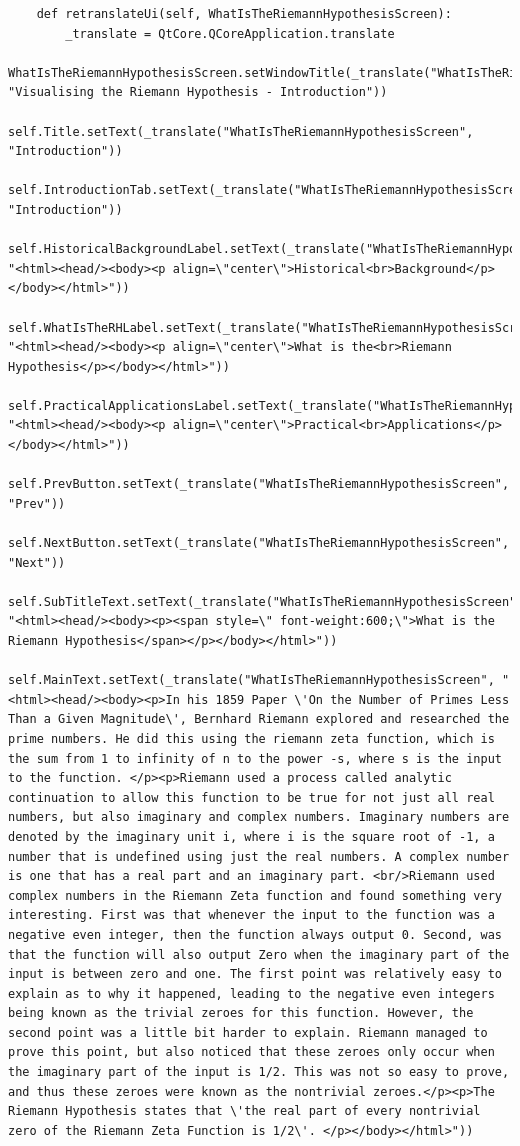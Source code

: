 \documentclass{article}
\begin{document}
\begin{lstlisting}
    def retranslateUi(self, WhatIsTheRiemannHypothesisScreen):
        _translate = QtCore.QCoreApplication.translate
        WhatIsTheRiemannHypothesisScreen.setWindowTitle(_translate("WhatIsTheRiemannHypothesisScreen", "Visualising the Riemann Hypothesis - Introduction"))
        self.Title.setText(_translate("WhatIsTheRiemannHypothesisScreen", "Introduction"))
        self.IntroductionTab.setText(_translate("WhatIsTheRiemannHypothesisScreen", "Introduction"))
        self.HistoricalBackgroundLabel.setText(_translate("WhatIsTheRiemannHypothesisScreen", "<html><head/><body><p align=\"center\">Historical<br>Background</p></body></html>"))
        self.WhatIsTheRHLabel.setText(_translate("WhatIsTheRiemannHypothesisScreen", "<html><head/><body><p align=\"center\">What is the<br>Riemann Hypothesis</p></body></html>"))
        self.PracticalApplicationsLabel.setText(_translate("WhatIsTheRiemannHypothesisScreen", "<html><head/><body><p align=\"center\">Practical<br>Applications</p></body></html>"))
        self.PrevButton.setText(_translate("WhatIsTheRiemannHypothesisScreen", "Prev"))
        self.NextButton.setText(_translate("WhatIsTheRiemannHypothesisScreen", "Next"))
        self.SubTitleText.setText(_translate("WhatIsTheRiemannHypothesisScreen", "<html><head/><body><p><span style=\" font-weight:600;\">What is the Riemann Hypothesis</span></p></body></html>"))
        self.MainText.setText(_translate("WhatIsTheRiemannHypothesisScreen", "<html><head/><body><p>In his 1859 Paper \'On the Number of Primes Less Than a Given Magnitude\', Bernhard Riemann explored and researched the prime numbers. He did this using the riemann zeta function, which is the sum from 1 to infinity of n to the power -s, where s is the input to the function. </p><p>Riemann used a process called analytic continuation to allow this function to be true for not just all real numbers, but also imaginary and complex numbers. Imaginary numbers are denoted by the imaginary unit i, where i is the square root of -1, a number that is undefined using just the real numbers. A complex number is one that has a real part and an imaginary part. <br/>Riemann used complex numbers in the Riemann Zeta function and found something very interesting. First was that whenever the input to the function was a negative even integer, then the function always output 0. Second, was that the function will also output Zero when the imaginary part of the input is between zero and one. The first point was relatively easy to explain as to why it happened, leading to the negative even integers being known as the trivial zeroes for this function. However, the second point was a little bit harder to explain. Riemann managed to prove this point, but also noticed that these zeroes only occur when the imaginary part of the input is 1/2. This was not so easy to prove, and thus these zeroes were known as the nontrivial zeroes.</p><p>The Riemann Hypothesis states that \'the real part of every nontrivial zero of the Riemann Zeta Function is 1/2\'. </p></body></html>"))

\end{lstlisting}
\end{document}
